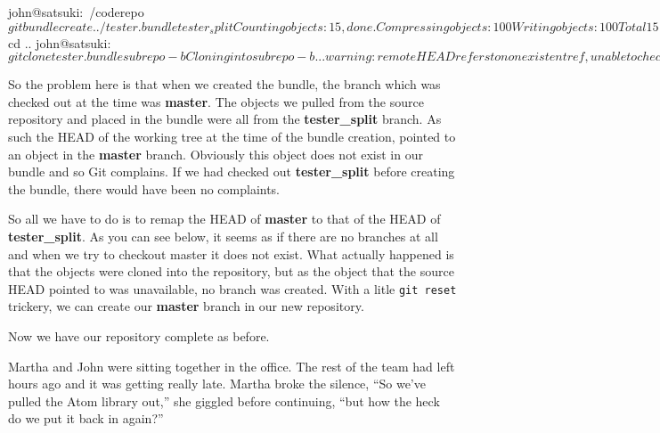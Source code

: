 {\begin{code}
john@satsuki:~/coderepo$ git bundle create ../tester.bundle tester_split 
Counting objects: 15, done.
Compressing objects: 100%
Writing objects: 100%
Total 15 (delta 3), reused 0 (delta 0)
john@satsuki:~/coderepo$ cd ..
john@satsuki:~$ git clone tester.bundle subrepo-b
Cloning into subrepo-b...
warning: remote HEAD refers to nonexistent ref, unable to checkout.

john@satsuki:~$
\end{code}

So the problem here is that when we created the bundle, the branch which was checked out at the time was \textbf{master}.
The objects we pulled from the source repository and placed in the bundle were all from the \textbf{tester\_split} branch.
As such the HEAD of the working tree at the time of the bundle creation, pointed to an object in the \textbf{master} branch.
Obviously this object does not exist in our bundle and so Git complains.
If we had checked out \textbf{tester\_split} before creating the bundle, there would have been no complaints.

So all we have to do is to remap the HEAD of \textbf{master} to that of the HEAD of \textbf{tester\_split}.
As you can see below, it seems as if there are no branches at all and when we try to checkout master it does not exist.
What actually happened is that the objects were cloned into the repository, but as the object that the source HEAD pointed to was unavailable,
no branch was created.
With a litle \texttt{git reset} trickery, we can create our \textbf{master} branch in our new repository.


Now we have our repository complete as before.

\begin{trenches}
Martha and John were sitting together in the office.
The rest of the team had left hours ago and it was getting really late.
Martha broke the silence, ``So we've pulled the Atom library out,'' she giggled before continuing, ``but how the heck do we put it back in again?''


\end{trenches}}
